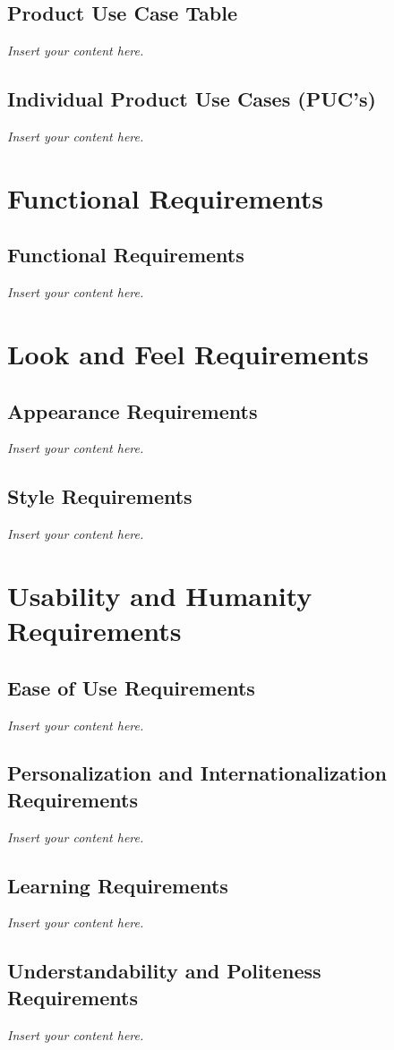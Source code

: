 \documentclass[12pt]{article}
\newcommand{\lips}{\textit{Insert your content here.}}
\begin{document}
\subsection{Product Use Case Table}
\lips
\subsection{Individual Product Use Cases (PUC's)}
\lips

\section{Functional Requirements}
\subsection{Functional Requirements}
\lips

\section{Look and Feel Requirements}
\subsection{Appearance Requirements}
\lips
\subsection{Style Requirements}
\lips

\section{Usability and Humanity Requirements}
\subsection{Ease of Use Requirements}
\lips
\subsection{Personalization and Internationalization Requirements}
\lips
\subsection{Learning Requirements}
\lips
\subsection{Understandability and Politeness Requirements}
\lips
\end{document}
